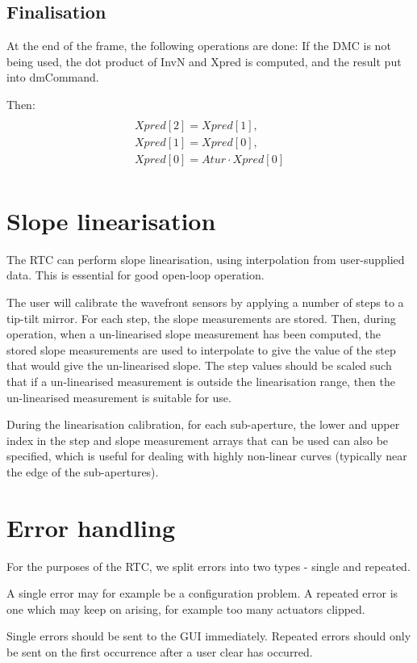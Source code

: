 \documentclass[a4,10pt]{article}
\begin{document}
\subsection{Finalisation}
At the end of the frame, the following operations are done:
If the DMC is not being used, the dot product of InvN and Xpred is
computed, and the result put into dmCommand.

Then: 
\begin{multline}\\
Xpred[2]=Xpred[1],\\
Xpred[1]=Xpred[0],\\
Xpred[0]=Atur \cdot Xpred[0]\\
\end{multline}

\section{Slope linearisation}
\label{sect:linearisation}
The RTC can perform slope linearisation, using interpolation from
user-supplied data.  This is essential for good open-loop operation.

The user will calibrate the wavefront sensors by applying a number of
steps to a tip-tilt mirror.  For each step, the slope measurements are
stored.  Then, during operation, when a un-linearised slope
measurement has been computed, the stored slope measurements are used
to interpolate to give the value of the step that would give the
un-linearised slope.  The step values should be scaled such that if a
un-linearised measurement is outside the linearisation range, then the
un-linearised measurement is suitable for use.

During the linearisation calibration, for each sub-aperture, the lower
and upper index in the step and slope measurement arrays that can be
used can also be specified, which is useful for dealing with highly
non-linear curves (typically near the edge of the sub-apertures).  


\section{Error handling}
For the purposes of the RTC, we split errors into two types - single
and repeated.  

A single error may for example be a configuration problem.  A repeated
error is one which may keep on arising, for example too many actuators
clipped.  

Single errors should be sent to the GUI immediately.  Repeated errors
should only be sent on the first occurrence after a user clear has
occurred.  
\end{document}
